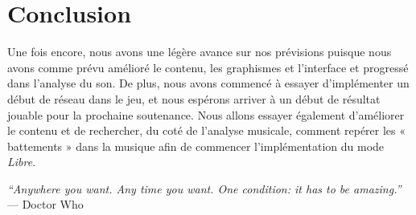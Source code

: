 \documentclass[12pt,a4paper]{article}
\begin{document}
	\section{Conclusion}
	Une fois encore, nous avons une légère avance sur nos prévisions puisque nous avons comme prévu amélioré le contenu, les graphismes et l'interface et progressé dans l'analyse du son. De plus, nous avons commencé à essayer d'implémenter un début de réseau dans le jeu, et nous espérons arriver à un début de résultat jouable pour la prochaine soutenance. Nous allons essayer également d'améliorer le contenu et de rechercher, du coté de l'analyse musicale, comment repérer les « battements » dans la musique afin de commencer l'implémentation du mode \emph{Libre}.
	\vspace{1.5cm}
	\par
	\emph{``Anywhere you want. Any time you want. One condition: it has to be amazing.''} --- Doctor Who
\end{document}

